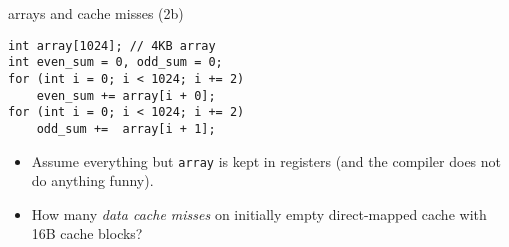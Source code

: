 \begin{frame}[fragile,label=arrayMissesOddEven3]{arrays and cache misses (2b)}
\begin{lstlisting}
int array[1024]; // 4KB array
int even_sum = 0, odd_sum = 0;
for (int i = 0; i < 1024; i += 2)
    even_sum += array[i + 0];
for (int i = 0; i < 1024; i += 2)
    odd_sum +=  array[i + 1];
\end{lstlisting}
    \begin{itemize}
        \item {\small
    Assume everything but {\tt array} is kept in registers (and the compiler does not do
    anything funny).
        }
    \item
        How many \textit{data cache misses} on initially empty  direct-mapped cache with 16B cache blocks?
    \end{itemize}
\end{frame}

